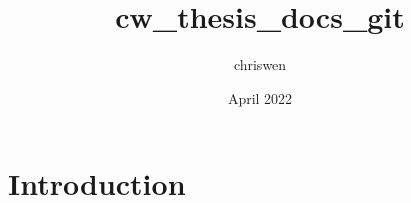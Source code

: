 \documentclass{article}
\title{cw_thesis_docs_git}
\author{chriswen }
\date{April 2022}
\begin{document}
\maketitle

\section{Introduction}
\end{document}
